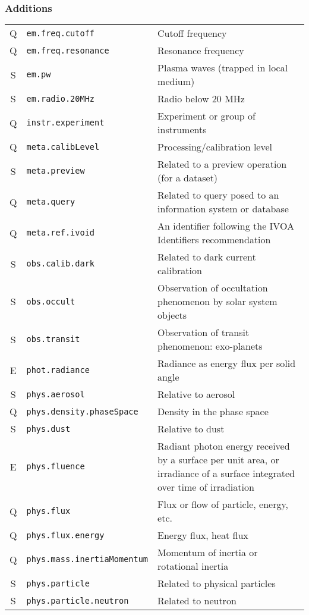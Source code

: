 \documentclass[11pt,a4paper]{ivoa}
\begin{document}
\subsubsection*{Additions}
\footnotesize\begin{longtable}[h!]{c|p{39.5ex}|D{0.45\textwidth}}
\sptablerule
Q & {\tt em.freq.cutoff} & Cutoff frequency\\
Q & {\tt em.freq.resonance} & Resonance frequency\\
S & {\tt em.pw} & Plasma waves (trapped in local medium)\\
S & {\tt em.radio.20MHz} & Radio below 20 MHz\\
Q & {\tt instr.experiment} & Experiment or group of instruments\\
Q & {\tt meta.calibLevel} & Processing/calibration level\\
S & {\tt meta.preview} & Related to a preview operation (for a dataset)\\
Q & {\tt meta.query} & Related to query posed to an information system or database\\
Q & {\tt meta.ref.ivoid} & An identifier following the IVOA Identifiers recommendation\\
S & {\tt obs.calib.dark} & Related to dark current calibration\\
S & {\tt obs.occult} & Observation of occultation phenomenon by solar system objects\\
S & {\tt obs.transit} & Observation of transit phenomenon: exo-planets\\
E & {\tt phot.radiance} & Radiance as energy flux per solid angle\\
S & {\tt phys.aerosol} & Relative to aerosol\\
Q & {\tt phys.density.phaseSpace} & Density in the phase space\\
S & {\tt phys.dust} & Relative to dust\\
E & {\tt phys.fluence} & Radiant photon energy received by a surface per unit area, or irradiance of a surface integrated over time of irradiation\\
Q & {\tt phys.flux} & Flux or flow of particle, energy, etc.\\
Q & {\tt phys.flux.energy} & Energy flux, heat flux\\
Q & {\tt phys.mass.inertiaMomentum} & Momentum of inertia or rotational inertia\\
S & {\tt phys.particle} & Related to physical particles\\
S & {\tt phys.particle.neutron} & Related to neutron\\

\end{longtable}
\end{document}
